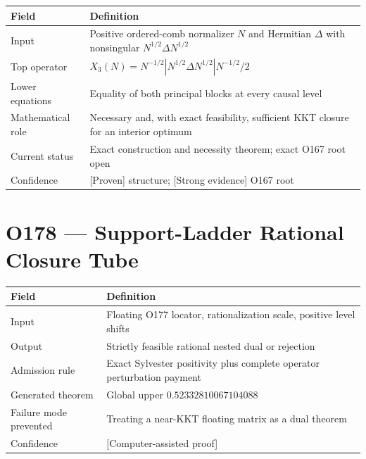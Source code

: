 \documentclass[11pt,a4paper,openany]{report}
\newcommand{\statusProven}{\textcolor{fingreen}{[Proven]}}
\newcommand{\statusStrong}{\textcolor{finblue}{[Strong evidence]}}
\begin{document}
\begin{center}
\begingroup\small
\setlength{\tabcolsep}{2.5pt}
\renewcommand{\arraystretch}{1.16}
\begin{longtable}{@{}p{}p{}@{}}
\toprule
\textbf{Field} & \textbf{Definition} \\
\midrule
\endhead
Input & Positive ordered-comb normalizer \(N\) and Hermitian \(\Delta\) with nonsingular \(N^{1/2}\Delta N^{1/2}\) \\
Top operator & \(X_3(N)=N^{-1/2}|N^{1/2}\Delta N^{1/2}|N^{-1/2}/2\) \\
Lower equations & Equality of both principal blocks at every causal level \\
Mathematical role & Necessary and, with exact feasibility, sufficient KKT closure for an interior optimum \\
Current status & Exact construction and necessity theorem; exact O167 root open \\
Confidence & \statusProven{} structure; \statusStrong{} O167 root \\
\bottomrule
\end{longtable}
\endgroup
\end{center}

\section{O178 --- Support-Ladder Rational Closure Tube}

\begin{center}
\begingroup\small
\setlength{\tabcolsep}{2.5pt}
\renewcommand{\arraystretch}{1.16}
\begin{longtable}{@{}p{}p{}@{}}
\toprule
\textbf{Field} & \textbf{Definition} \\
\midrule
\endhead
Input & Floating O177 locator, rationalization scale, positive level shifts \\
Output & Strictly feasible rational nested dual or rejection \\
Admission rule & Exact Sylvester positivity plus complete operator perturbation payment \\
Generated theorem & Global upper \(0.52332810067104088\) \\
Failure mode prevented & Treating a near-KKT floating matrix as a dual theorem \\
Confidence & \textcolor{fingreen}{[Computer-assisted proof]} \\
\bottomrule
\end{longtable}
\endgroup
\end{center}
\end{document}
